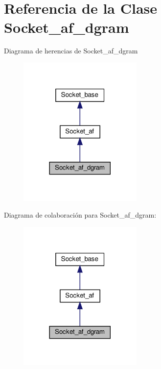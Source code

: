 \hypertarget{classSocket__af__dgram}{}\section{Referencia de la Clase Socket\+\_\+af\+\_\+dgram}
\label{classSocket__af__dgram}


Diagrama de herencias de Socket\+\_\+af\+\_\+dgram\nopagebreak
\begin{figure}[H]
\begin{center}
\leavevmode
\includegraphics[width=173pt]{classSocket__af__dgram__inherit__graph}
\end{center}
\end{figure}


Diagrama de colaboración para Socket\+\_\+af\+\_\+dgram\+:\nopagebreak
\begin{figure}[H]
\begin{center}
\leavevmode
\includegraphics[width=173pt]{classSocket__af__dgram__coll__graph}
\end{center}
\end{figure}

